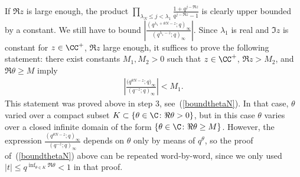 If $\Re z$ is large enough, the product $\prod\limits_{\lambda_N \leq j < \lambda_1}{\frac{1 + q^{j - \Re z}}{q^{j - \Re z} - 1}}$ is clearly upper bounded by a constant. We still have to bound $\left|\frac{(q^{\lambda_1 + \theta N - z}; q)_{\infty}}{(q^{\lambda_1 - z}; q)_{\infty}}\right|$. Since $\lambda_1$ is real and $\Im z$ is constant for $z\in\CC^+$, $\Re z$ large enough, it suf\/f\/ices to prove the following statement: there exist constants $M_1, M_2 > 0$ such that $z\in\CC^+$, $\Re z > M_2$, and $\Re\theta \geq M$ imply
\begin{gather*}
\left| \frac{\big(q^{\theta N - z}; q\big)_{\infty}}{(q^{-z}; q)_{\infty}} \right| < M_1.
\end{gather*}
This statement was proved above in step 3, see~(\ref{boundthetaN}). In that case, $\theta$ varied over a compact subset $K\subset\{\theta\in\C\colon \Re\theta > 0\}$, but in this case $\theta$ varies over a closed inf\/inite domain of the form $\{\theta\in\C\colon \Re\theta \geq M\}$. However, the expression $\frac{(q^{\theta N - z}; q)_{\infty}}{(q^{-z}; q)_{\infty}}$ depends on $\theta$ only by means of $q^{\theta}$, so the proof of~(\ref{boundthetaN}) above can be repeated word-by-word, since we only used $|t|\leq q^{\inf_{\theta\in K}{\Re\theta}}< 1$ in that proof.


